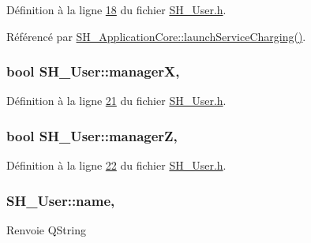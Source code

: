 Définition à la ligne \hyperlink{SH__User_8h_source_l00018}{18} du fichier \hyperlink{SH__User_8h_source}{S\-H\-\_\-\-User.\-h}.



Référencé par \hyperlink{classSH__ApplicationCore_a74af071d9fefb1f0c3373e6501d04d62}{S\-H\-\_\-\-Application\-Core\-::launch\-Service\-Charging()}.

\hypertarget{classSH__User_a1794a1229076bcaf2de708146db574b3}{
\subsubsection[{manager\-X}]{\setlength{\rightskip}{0pt plus 5cm}bool S\-H\-\_\-\-User\-::manager\-X\hspace{0.3cm}{\ttfamily [read]}, {\ttfamily [inherited]}}}\label{classSH__User_a1794a1229076bcaf2de708146db574b3}


Définition à la ligne \hyperlink{SH__User_8h_source_l00021}{21} du fichier \hyperlink{SH__User_8h_source}{S\-H\-\_\-\-User.\-h}.

\hypertarget{classSH__User_ad5e987610bea0bd50bbc0a1d1ac0aed5}{
\subsubsection[{manager\-Z}]{\setlength{\rightskip}{0pt plus 5cm}bool S\-H\-\_\-\-User\-::manager\-Z\hspace{0.3cm}{\ttfamily [read]}, {\ttfamily [inherited]}}}\label{classSH__User_ad5e987610bea0bd50bbc0a1d1ac0aed5}


Définition à la ligne \hyperlink{SH__User_8h_source_l00022}{22} du fichier \hyperlink{SH__User_8h_source}{S\-H\-\_\-\-User.\-h}.

\hypertarget{classSH__User_ae32b20d52e62ec32c1f335006f52214e}{
\subsubsection[{name}]{\setlength{\rightskip}{0pt plus 5cm}S\-H\-\_\-\-User\-::name\hspace{0.3cm}{\ttfamily [read]}, {\ttfamily [inherited]}}}\label{classSH__User_ae32b20d52e62ec32c1f335006f52214e}
\begin{DoxyReturn}{Renvoie}
Q\-String 
\end{DoxyReturn}


